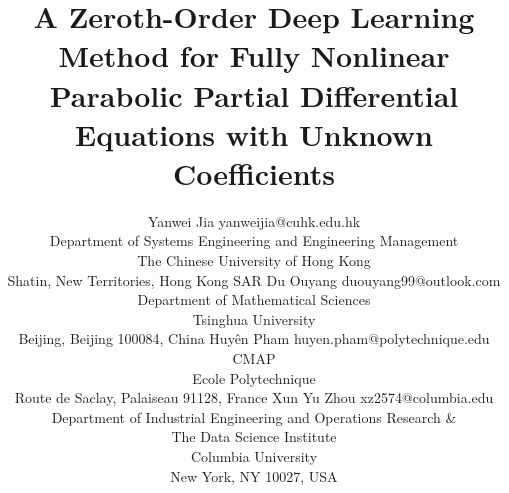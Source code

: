 \documentclass[twoside,11pt]{article}
\newcommand{\1}{\mathbf{1}}
\numberwithin{equation}{section}
\begin{document}
\title{A Zeroth-Order Deep Learning Method for Fully Nonlinear Parabolic Partial Differential Equations with Unknown Coefficients}

\author{\name Yanwei Jia \email yanweijia@cuhk.edu.hk \\
\addr Department of Systems Engineering and Engineering Management\\
The Chinese University of Hong Kong\\
Shatin, New Territories, Hong Kong SAR
       \AND
\name Du Ouyang \email duouyang99@outlook.com \\
\addr Department of Mathematical Sciences\\
Tsinghua University\\
Beijing, Beijing 100084, China
\AND
\name Huy\^en Pham \email huyen.pham@polytechnique.edu \\
\addr CMAP \\ Ecole Polytechnique\\
Route de Saclay, Palaiseau 91128, France
\AND
\name Xun Yu Zhou \email xz2574@columbia.edu \\
\addr Department of Industrial Engineering and Operations Research \&\\
The Data Science Institute\\
Columbia University\\
New York, NY 10027, USA
}

\editor{}

\maketitle
\end{document}
